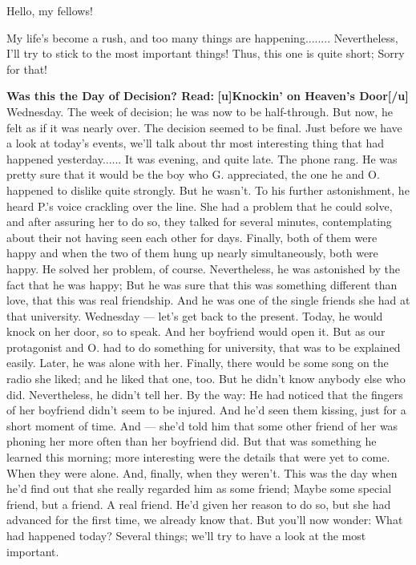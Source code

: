 Hello, my fellows!

My life's become a rush, and too many things are happening........
Nevertheless, I'll try to stick to the most important things!
Thus, this one is quite short; Sorry for that!

\textbf{Was this the Day of Decision? Read:}
\textbf{[u]Knockin' on Heaven's Door[/u]}
Wednesday. 
The week of decision; he was now to be half-through. 
But now, he felt as if it was nearly over. 
The decision seemed to be final. 
Just before we have a look at today's events, we'll talk about thr most interesting thing that had happened yesterday......
It was evening, and quite late. 
The phone rang. 
He was pretty sure that it would be the boy who G. appreciated, the one he and O. happened to dislike quite strongly. 
But he wasn't. 
To his further astonishment, he heard P.'s voice crackling over the line. 
She had a problem that he could solve, and after assuring her to do so, they talked for several minutes, contemplating about their not having seen each other for days. 
Finally, both of them were happy and when the two of them hung up nearly simultaneously, both were happy. 
He solved her problem, of course. 
Nevertheless, he was astonished by the fact that he was happy; But he was sure that this was something different than love, that this was real friendship. 
And he was one of the single friends she had at that university. 
Wednesday --- let's get back to the present. 
Today, he would knock on her door, so to speak. 
And her boyfriend would open it. 
But as our protagonist and O. had to do something for university, that was to be explained easily. 
Later, he was alone with her. Finally, there would be some song on the radio she liked; and he liked that one, too. 
But he didn't know anybody else who did. 
Nevertheless, he didn't tell her. 
By the way: He had noticed that the fingers of her boyfriend didn't seem to be injured. And he'd seen them kissing, just for a short moment of time. 
And --- she'd told him that some other friend of her was phoning her more often than her boyfriend did. 
But that was something he learned this morning; more interesting were the details that were yet to come. 
When they were alone. 
And, finally, when they weren't. 
This was the day when he'd find out that she really regarded him as some friend; Maybe some special friend, but a friend. 
A real friend. 
He'd given her reason to do so, but she had advanced for the first time, we already know that. 
But you'll now wonder: What had happened today?
Several things; we'll try to have a look at the most important. 
